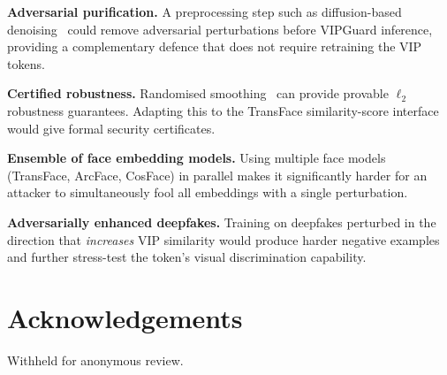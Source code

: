 \documentclass[12pt,a4paper]{article}
\begin{document}
\textbf{Adversarial purification.}  A preprocessing step such as diffusion-based
denoising~\cite{nie2022diffusion} could remove adversarial perturbations before
VIPGuard inference, providing a complementary defence that does not require
retraining the VIP tokens.

\textbf{Certified robustness.}  Randomised smoothing~\cite{cohen2019certified}
can provide provable $\ell_2$ robustness guarantees.  Adapting this to the
TransFace similarity-score interface would give formal security certificates.

\textbf{Ensemble of face embedding models.}  Using multiple face models
(TransFace, ArcFace, CosFace) in parallel makes it significantly harder for
an attacker to simultaneously fool all embeddings with a single perturbation.

\textbf{Adversarially enhanced deepfakes.}  Training on deepfakes perturbed
in the direction that \emph{increases} VIP similarity would produce harder
negative examples and further stress-test the token's visual discrimination
capability.

\section*{Acknowledgements}

Withheld for anonymous review.
\end{document}
